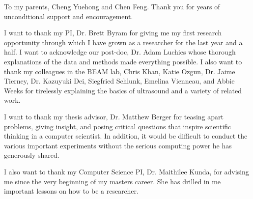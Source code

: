 \documentclass{ucbthesis}
\begin{document}
\begin{frontmatter}

\begin{dedication}
\null\vfil
\begin{center}
  To my parents, Cheng Yuehong and Chen Feng. Thank you for years of unconditional support and encouragement.
\end{center}
\vfil\null
\end{dedication}

\tableofcontents
\clearpage
\listoffigures
\clearpage
\listoftables

\begin{acknowledgements}
  I want to thank my PI, Dr. Brett Byram for giving me my first research opportunity through which I have grown as a researcher for the last year and a half. I want to acknowledge our post-doc, Dr. Adam Luchies whose thorough explanations of the data and methods made everything possible. I also want to thank my colleagues in the BEAM lab, Chris Khan, Katie Ozgun, Dr. Jaime Tierney, Dr. Kazuyuki Dei, Siegfried Schlunk, Emelina Vienneau, and Abbie Weeks for tirelessly explaining the basics of ultrasound and a variety of related work.

  I want to thank my thesis advisor, Dr. Matthew Berger for teasing apart problems, giving insight, and posing critical questions that inspire scientific thinking in a computer scientist. In addition, it would be difficult to conduct the various important experiments without the serious computing power he has generously shared.

  I also want to thank my Computer Science PI, Dr. Maithilee Kunda, for advising me since the very beginning of my masters career. She has drilled in me important lessons on how to be a researcher.

\end{acknowledgements}

\end{frontmatter}

\pagestyle{headings}










\printbibliography
\end{document}
